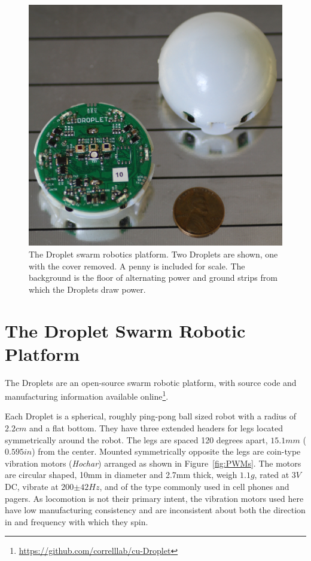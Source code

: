 \documentclass[letterpaper, 10pt, conference]{ieeeconf}
\begin{document}
\begin{figure}[!htb]
	\centering
		\includegraphics[width=0.8\columnwidth]{./Images/Droplets.png}
	\caption{The Droplet swarm robotics platform. Two Droplets are shown, one with the cover removed. A penny is included for scale. The background is the floor of alternating power and ground strips from which the Droplets draw power.}
	\label{Droplets}
\end{figure}


\section{The Droplet Swarm Robotic Platform}
The Droplets are an open-source swarm robotic platform, with source code and manufacturing information available online\footnote{\url{https://github.com/correlllab/cu-Droplet}}. 

Each Droplet is a spherical, roughly ping-pong ball sized robot with a radius of $2.2cm$ and a flat bottom. They have three extended headers for legs located symmetrically around the robot. The legs are spaced 120 degrees apart, $15.1mm$ ($0.595in$) from the center. Mounted symmetrically opposite the legs are coin-type vibration motors (\emph{Hochar}) arranged as shown in Figure~\ref{fig:PWMs}. The  motors  are circular shaped, 10mm in diameter and 2.7mm thick, weigh $1.1g$, rated at $3V$ DC, vibrate at 200$\pm42 Hz$, and of the type commonly used in cell phones and pagers. As locomotion is not their primary intent, the vibration motors used here have low manufacturing consistency and are inconsistent about both the direction in and frequency with which they spin.
\end{document}
